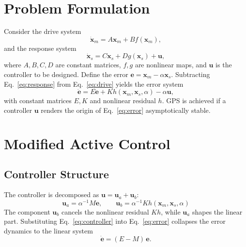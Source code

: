 \documentclass[11pt,a4paper]{article}
\begin{document}
\section{Problem Formulation}

Consider the drive system
\begin{equation}
\dot{\mathbf{x}}_m = A\mathbf{x}_m + Bf(\mathbf{x}_m),
\label{eq:drive}
\end{equation}
and the response system
\begin{equation}
\dot{\mathbf{x}}_s = C\mathbf{x}_s + Dg(\mathbf{x}_s) + \mathbf{u},
\label{eq:response}
\end{equation}
where $A,B,C,D$ are constant matrices, $f,g$ are nonlinear maps, and $\mathbf{u}$ is the controller to be designed. Define the error $\mathbf{e} = \mathbf{x}_m - \alpha\mathbf{x}_s$. Subtracting Eq.~\eqref{eq:response} from Eq.~\eqref{eq:drive} yields the error system
\begin{equation}
\dot{\mathbf{e}} = E\mathbf{e} + Kh(\mathbf{x}_m,\mathbf{x}_s,\alpha) - \alpha\mathbf{u},
\label{eq:error}
\end{equation}
with constant matrices $E,K$ and nonlinear residual $h$. GPS is achieved if a controller $\mathbf{u}$ renders the origin of Eq.~\eqref{eq:error} asymptotically stable.

\section{Modified Active Control}

\subsection{Controller Structure}

The controller is decomposed as $\mathbf{u} = \mathbf{u}_a + \mathbf{u}_b$:
\begin{equation}
\boxed{\mathbf{u}_a = \alpha^{-1} M\mathbf{e}, \qquad \mathbf{u}_b = \alpha^{-1} Kh(\mathbf{x}_m,\mathbf{x}_s,\alpha)}
\label{eq:controller}
\end{equation}
The component $\mathbf{u}_b$ cancels the nonlinear residual $K h$, while $\mathbf{u}_a$ shapes the linear part. Substituting Eq.~\eqref{eq:controller} into Eq.~\eqref{eq:error} collapses the error dynamics to the linear system
\begin{equation}
\dot{\mathbf{e}} = (E - M)\,\mathbf{e}.
\label{eq:closedloop}
\end{equation}
\end{document}
